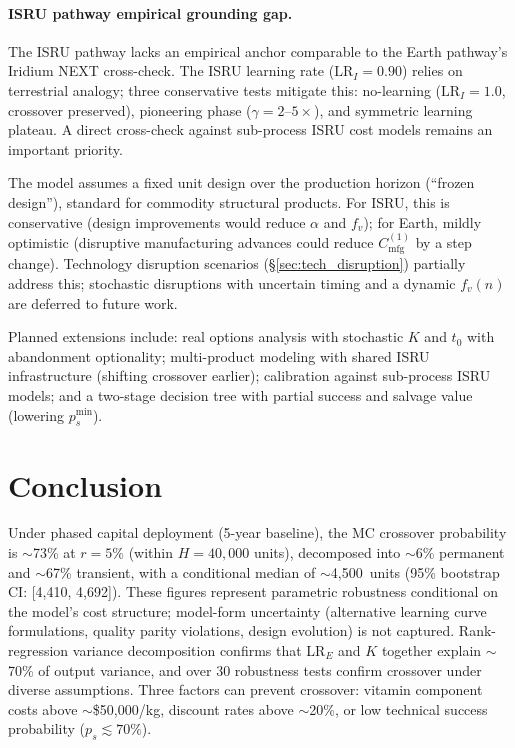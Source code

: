 \documentclass[preprint,12pt]{elsarticle}
\begin{document}
\paragraph{ISRU pathway empirical grounding gap.} The ISRU pathway lacks an empirical anchor comparable to the Earth pathway's Iridium NEXT cross-check. The ISRU learning rate ($\mathrm{LR}_I = 0.90$) relies on terrestrial analogy; three conservative tests mitigate this: no-learning ($\mathrm{LR}_I = 1.0$, crossover preserved), pioneering phase ($\gamma = 2$--$5\times$), and symmetric learning plateau. A direct cross-check against sub-process ISRU cost models remains an important priority.

The model assumes a fixed unit design over the production horizon (``frozen design''), standard for commodity structural products. For ISRU, this is conservative (design improvements would reduce $\alpha$ and $f_v$); for Earth, mildly optimistic (disruptive manufacturing advances could reduce $C_{\mathrm{mfg}}^{(1)}$ by a step change). Technology disruption scenarios (\S\ref{sec:tech_disruption}) partially address this; stochastic disruptions with uncertain timing and a dynamic $f_v(n)$ are deferred to future work.

Planned extensions include: real options analysis with stochastic $K$ and $t_0$ with abandonment optionality; multi-product modeling with shared ISRU infrastructure (shifting crossover earlier); calibration against sub-process ISRU models; and a two-stage decision tree with partial success and salvage value (lowering $p_s^{\min}$).

\section{Conclusion}
\label{sec:conclusion}

Under phased capital deployment (5-year baseline), the MC crossover probability is ${\sim}$73\% at $r = 5\%$ (within $H = 40{,}000$ units), decomposed into ${\sim}$6\% permanent and ${\sim}$67\% transient, with a conditional median of $\sim$4{,}500~units (95\% bootstrap CI: [4{,}410, 4{,}692]). These figures represent parametric robustness conditional on the model's cost structure; model-form uncertainty (alternative learning curve formulations, quality parity violations, design evolution) is not captured. Rank-regression variance decomposition confirms that LR$_E$ and $K$ together explain ${\sim}$70\% of output variance, and over 30 robustness tests confirm crossover under diverse assumptions. Three factors can prevent crossover: vitamin component costs above ${\sim}$\$50{,}000/kg, discount rates above ${\sim}$20\%, or low technical success probability ($p_s \lesssim 70\%$).
\end{document}
